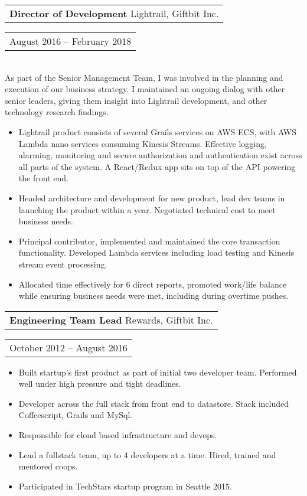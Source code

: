 \documentclass{resume}
\begin{document}
\begin{resume}
    \vspace{+0.1in}
    \begin{tabular}[t]{@{}l}
        {\bf Director of Development} Lightrail, Giftbit Inc.
    \end{tabular}\vspace{+0.05in}
    \hfill
    \begin{tabular}[t]{l@{}}
        August 2016 -- February 2018
    \end{tabular}\\
    As part of the Senior Management Team, I was involved in the planning and execution of our business strategy.
    I maintained an ongoing dialog with other senior leaders, giving them insight into Lightrail development, and other technology research findings.
    \vspace{+0.05in}
    \begin{itemize} \itemsep -2pt
    \item Lightrail product consists of several Grails services on AWS ECS, with AWS Lambda nano services consuming Kinesis Streams. Effective logging, alarming, monitoring and secure authorization and authentication exist across all parts of the system. A React/Redux app sits on top of the API powering the front end.
    \item Headed architecture and development for new product, lead dev teams in launching the product within a year. Negotiated technical cost to meet business needs.
    \item Principal contributor, implemented and maintained the core transaction functionality. Developed Lambda services including load testing and Kinesis stream event processing.
    \item Allocated time effectively for 6 direct reports, promoted work/life balance while ensuring business needs were met, including during overtime pushes.
    \end{itemize}

    \begin{tabular}[t]{@{}l}
        {\bf Engineering Team Lead} Rewards, Giftbit Inc.
    \end{tabular}\vspace{+0.05in}
    \hfill
    \begin{tabular}[t]{l@{}}
        October 2012 -- August 2016
    \end{tabular}
    \begin{itemize} \itemsep -2pt
    \item Built startup's first product as part of initial two developer team. Performed well under high pressure and tight deadlines.
    \item Developer across the full stack from front end to datastore. Stack included Coffeescript, Grails and MySql.
    \item Responsible for cloud based infrastructure and devops.
    \item Lead a fullstack team, up to 4 developers at a time. Hired, trained and mentored coops.
    \item Participated in TechStars startup program in Seattle 2015.
    \end{itemize}


\end{resume}
\end{document}
